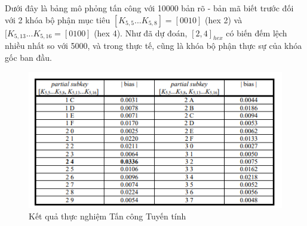 Dưới đây là bảng mô phỏng tấn công với 10000 bản rõ - bản mã biết trước đối với 2 khóa bộ phận mục tiêu $[K_{5,5}...K_{5,8}] = [0010]$ (hex 2) và $[K_{5,13}...K_{5,16} = [0100]$ (hex 4). Như đã dự đoán, $[2,4]_{hex}$ có biến đếm lệch nhiều nhất so với 5000, và trong thực tế, cũng là khóa bộ phận thực sự của khóa gốc ban đầu.
    \begin{figure}
    \centering
    \includegraphics[scale = 0.9]{Các công cụ và kĩ thuật sử dụng trong tấn công/exp linear.png}
    
    \caption{Kết quả thực nghiệm Tấn công Tuyến tính}
    \end{figure}
    